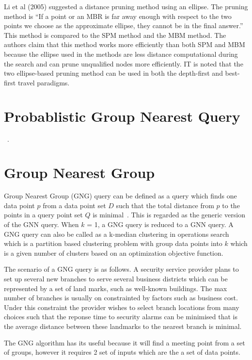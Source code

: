 \documentclass[a4paper,11pt]{article}
\begin{document}
Li et al (2005) suggested a distance pruning method using an ellipse. The pruning method is ``If a point or an MBR is far away enough with respect to the two points we choose as the approximate ellipse, they cannot be in the final answer.'' This method is compared to the SPM method and the MBM method. The authors claim that this method works more efficiently than both SPM and MBM because the ellipse used in the methods are less distance computational during the search and can prune unqualified nodes more efficiently. IT is noted that the two ellipse-based pruning method can be used in both the depth-first and best-first travel paradigms.

\section{Probablistic Group Nearest Query}

~\cite{lian2008probabilistic}.

\section{Group Nearest Group}

Group Nearest Group (GNG) query can be defined as a query which finds one data point $p$ from a data point set $D$ such that the total distance from $p$ to the points in a query point set $Q$ is minimal~\cite{deng2012group}. This is regarded as the generic version of the GNN query. When $k$ = 1, a GNG query is reduced to a GNN query. A GNG query can also be called as a k-median clustering in operations search which is a partition based clustering problem with group data points into $k$ which is a given number of clusters based on an optimization objective function.

The scenario of a GNG query is as follows. A security service provider plans to set up several new branches to serve several business districts which can be represented by a set of land marks, such as well-known buildings. The max number of branches is usually on constrainted by factors such as business cost. Under this constraint the provider wishes to select branch locations from many choices such that the reponse time to security alarms can be minimised that is the average distance between these landmarks to the nearest branch is minimal.

The GNG algorithm has its useful because it will find a meeting point from a set of groups, however it requires 2 set of inputs which are the a set of data points. 
\end{document}
